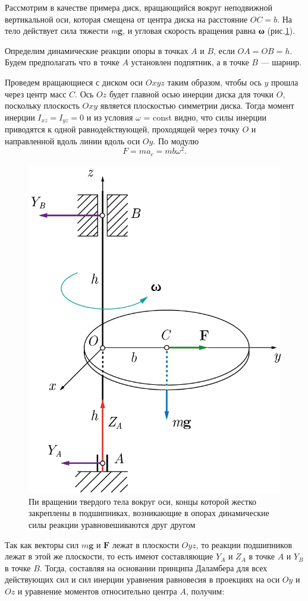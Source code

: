 \documentclass[14pt,a4paper,oneside]{extarticle}	%
\begin{document}
Рассмотрим в качестве примера диск, вращающийся вокруг неподвижной вертикальной оси, которая смещена от центра диска на расстояние $ OC=b $. 
На тело действует сила тяжести \textit{m}\textbf{g}, и угловая скорость вращения равна \textbf{ω} (рис.\ref{freeaxis-5}).

Определим динамические реакции опоры в точках $ A $ и $ B $, если $ OA = OB = h $.
Будем предполагать что в точке $ A $ установлен подпятник, а в точке $ B $ — шарнир.

Проведем вращающиеся с диском оси $ Oxyz $ таким образом, чтобы ось $ y $ прошла через центр масс $ C $.
Ось $ Oz $ будет главной осью инерции диска для точки $ O $, поскольку плоскость $ Oxy $ является плоскостью симметрии диска.
Тогда момент инерции $ I_{xz} = I_{yz} = 0 $ и из условия $ \omega $ = const видно, что силы инерции приводятся к одной равнодействующей, проходящей через точку $ O $ и направленной вдоль линии вдоль оси $Oy$.
По модулю $$ F = ma_{c} = mb\omega^{2}. $$

\begin{figure}[H] 	
	\centering 		
	\includegraphics[width=0.5\linewidth]{freeaxis-5.png}
	\caption{Пи вращении твердого тела вокруг оси, концы которой жестко закреплены в подшипниках, возникающие в опорах динамические силы реакции уравновешиваются друг другом}
	\label{freeaxis-5}
\end{figure}

Так как векторы сил $ m\textbf{g} $ и $ \textbf{F} $ лежат в плоскости $ Oyz $, то реакции подшипников лежат в этой же плоскости, то есть имеют составляющие $ Y_{A} $ и $ Z_{A} $ в точке $ A $ и $ Y_{B} $ в точке $ B $. 
Тогда, составляя на основании принципа Даламбера для всех действующих сил и сил инерции уравнения равновесия в проекциях на оси $ Oy $ и $ Oz $ и уравнение моментов относительно центра $ A $, получим:
\end{document}
